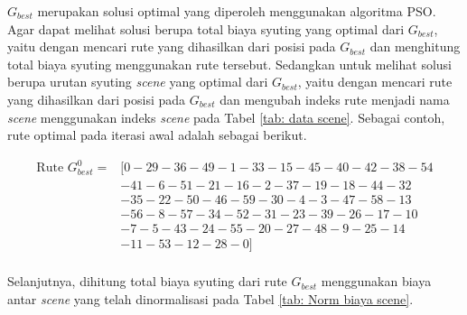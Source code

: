 {{\begin{enumerate}[align = left, left = 0cm, nolistsep]
\begin{enumerate}[label = (\alph*), align = left, left = 0cm, nolistsep]
                        $G_{best}$ merupakan solusi optimal yang diperoleh menggunakan algoritma PSO.
                        Agar dapat melihat solusi berupa total biaya syuting yang optimal dari $G_{best}$,
                        yaitu dengan mencari rute yang dihasilkan dari posisi pada $G_{best}$ dan menghitung total biaya syuting menggunakan rute tersebut.
                        Sedangkan untuk melihat solusi berupa urutan syuting \textit{scene}  yang optimal dari $G_{best}$,
                        yaitu dengan mencari rute yang dihasilkan dari posisi pada $G_{best}$ dan mengubah indeks rute menjadi nama \textit{scene} menggunakan indeks \textit{scene} pada Tabel \ref{tab: data scene}.
                        Sebagai contoh, rute optimal pada iterasi awal adalah sebagai berikut.

                        \begin{equation*}
                            \begin{aligned}
                                \text{Rute } G_{best}^{0} = & [ 0-29-36-49-1-33-15-45-40-42-38-54 \\
                                                            & -41-6-51-21-16-2-37-19-18-44-32     \\
                                                            & -35-22-50-46-59-30-4-3-47-58-13     \\
                                                            & -56-8-57-34-52-31-23-39-26-17-10    \\
                                                            & -7-5-43-24-55-20-27-48-9-25-14      \\
                                                            & -11-53-12-28-0]                     \\
                            \end{aligned}
                        \end{equation*}

                        Selanjutnya, dihitung total biaya syuting dari rute $G_{best}$ menggunakan biaya antar \textit{scene} yang telah dinormalisasi pada Tabel \ref{tab: Norm biaya scene}.


\end{enumerate}
\end{enumerate}}}
